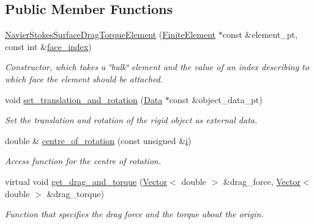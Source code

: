 \subsection*{Public Member Functions}
\begin{DoxyCompactItemize}
\item 
\hyperlink{classoomph_1_1NavierStokesSurfaceDragTorqueElement_a78e757739ad818c8a96309fcb515f44a}{Navier\+Stokes\+Surface\+Drag\+Torque\+Element} (\hyperlink{classoomph_1_1FiniteElement}{Finite\+Element} $\ast$const \&element\+\_\+pt, const int \&\hyperlink{classoomph_1_1FaceElement_a478d577ac6db67ecc80f1f02ae3ab170}{face\+\_\+index})
\begin{DoxyCompactList}\small\item\em Constructor, which takes a \char`\"{}bulk\char`\"{} element and the value of an index describing to which face the element should be attached. \end{DoxyCompactList}\item 
void \hyperlink{classoomph_1_1NavierStokesSurfaceDragTorqueElement_a12dcbd193703aefcd56632bff6c065d8}{set\+\_\+translation\+\_\+and\+\_\+rotation} (\hyperlink{classoomph_1_1Data}{Data} $\ast$const \&object\+\_\+data\+\_\+pt)
\begin{DoxyCompactList}\small\item\em Set the translation and rotation of the rigid object as external data. \end{DoxyCompactList}\item 
double \& \hyperlink{classoomph_1_1NavierStokesSurfaceDragTorqueElement_a8e8ee8de7783e5899909ed0a8842984e}{centre\+\_\+of\+\_\+rotation} (const unsigned \&\hyperlink{cfortran_8h_adb50e893b86b3e55e751a42eab3cba82}{i})
\begin{DoxyCompactList}\small\item\em Access function for the centre of rotation. \end{DoxyCompactList}\item 
virtual void \hyperlink{classoomph_1_1NavierStokesSurfaceDragTorqueElement_a3772165689b96fc7206d2a7c6da3a200}{get\+\_\+drag\+\_\+and\+\_\+torque} (\hyperlink{classoomph_1_1Vector}{Vector}$<$ double $>$ \&drag\+\_\+force, \hyperlink{classoomph_1_1Vector}{Vector}$<$ double $>$ \&drag\+\_\+torque)
\begin{DoxyCompactList}\small\item\em Function that specifies the drag force and the torque about the origin. \end{DoxyCompactList}\item 

\end{DoxyCompactItemize}
